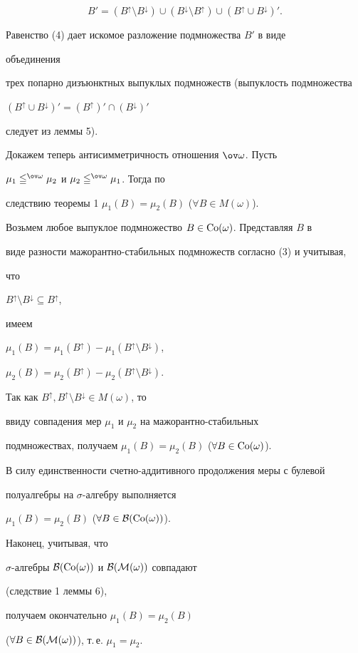 \begin{pf}
\begin{equation}
B'=(B^\uparrow\setminus B^\downarrow)\cup 


(B^\downarrow\setminus B^\uparrow)\cup 


(B^\uparrow\cup B^\downarrow)'. 


\end{equation} 


Равенство (4) дает искомое разложение подмножества $B'$ в виде 


объединения 


трех попарно дизъюнктных выпуклых подмножеств (выпуклость подмножества 


$(B^\uparrow\cup B^\downarrow)'= 


(B^\uparrow)'\cap(B^\downarrow)'$ 


следует из леммы 5). 


 


Докажем теперь антисимметричность отношения $\ov\omega$. Пусть 


$\mu_1\leqq^{\ov\omega}\mu_2$ и $\mu_2\leqq^{\ov\omega}\mu_1$. Тогда по 


следствию теоремы 1 $\mu_1(B)=\mu_2(B)$ ($\forall B\in M(\omega)$). 


Возьмем любое выпуклое подмножество $B\in\operatorname{Co}(\omega)$. Представляя $B$ в 


виде разности мажорантно-стабильных подмножеств согласно (3) и учитывая, 


что 


$B^\uparrow\setminus B^\downarrow\subseteq B^\uparrow$, 


имеем 


$\mu_1(B)=\mu_1(B^\uparrow)-\mu_1(B^\uparrow\setminus B^\downarrow)$, 


$\mu_2(B)=\mu_2(B^\uparrow)-\mu_2(B^\uparrow\setminus B^\downarrow)$. 


Так как $B^\uparrow,B^\uparrow\setminus B^\downarrow\in M(\omega)$, то 


ввиду совпадения мер $\mu_1$ и $\mu_2$ на мажорантно-стабильных 


подмножествах, получаем $\mu_1(B)=\mu_2(B)$ ($\forall B\in\operatorname{Co}(\omega)$). 


В силу единственности счетно-аддитивного продолжения меры с булевой 


полуалгебры на $\sigma$-алгебру \cite{4} выполняется 


$\mu_1(B)=\mu_2(B)$ ($\forall B\in \cal B(\operatorname{Co}(\omega))$).


Наконец, учитывая, что 


$\sigma$-алгебры $\cal B(\operatorname{Co}(\omega))$ и $\cal B(M(\omega))$ совпадают 


(следствие 1 леммы 6), 


получаем окончательно $\mu_1(B)=\mu_2(B)$ 


($\forall B\in\cal B(M(\omega))$), т.\,е. $\mu_1=\mu_2$. 


\end{pf} 


